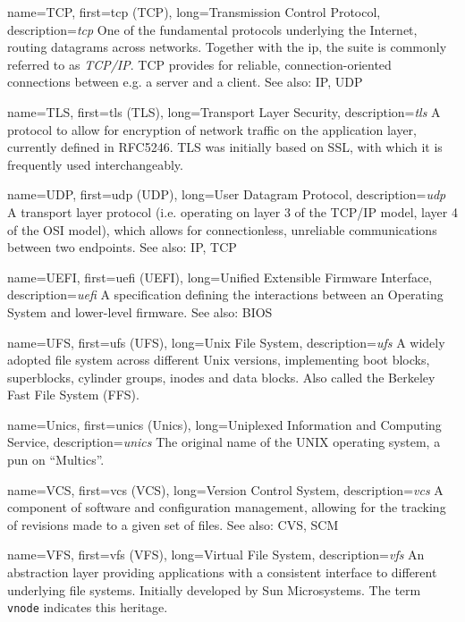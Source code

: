 {
	name={TCP},
	first={\acrlong{tcp} (TCP)},
	long={Transmission Control Protocol},
	description={{\em \acrlong{tcp}} One of the fundamental protocols underlying the
Internet, routing datagrams across networks.  Together
with the \acrlong{ip}, the suite is commonly referred
to as {\em TCP/IP}.  TCP provides for reliable,
connection-oriented connections between e.g. a server
and a client.  See also: IP, UDP}
}

{
	name={TLS},
	first={\acrlong{tls} (TLS)},
	long={Transport Layer Security},
	description={{\em \acrlong{tls}} A protocol to allow for
encryption of network traffic on the application layer, currently defined
in RFC5246.  TLS was initially based on SSL, with which it is frequently
used interchangeably.}
}

{
	name={UDP},
	first={\acrlong{udp} (UDP)},
	long={User Datagram Protocol},
	description={{\em \acrlong{udp}} A transport
layer protocol (i.e. operating on layer 3 of the
TCP/IP model, layer 4 of the OSI model), which allows
for connectionless, unreliable communications between
two endpoints.  See also: IP, TCP}
}

{
	name={UEFI},
	first={\acrlong{uefi} (UEFI)},
	long={Unified Extensible Firmware Interface},
	description={{\em \acrlong{uefi}} A specification
defining the interactions between an Operating System and lower-level
firmware.  See also: BIOS}
}

{
	name={UFS},
	first={\acrlong{ufs} (UFS)},
	long={Unix File System},
	description={{\em \acrlong{ufs}} A widely adopted file system across
different Unix versions, implementing boot blocks, superblocks, cylinder
groups, inodes and data blocks.  Also called the Berkeley Fast File System
(FFS).}
}

{
	name={Unics},
	first={\acrlong{unics} (Unics)},
	long={Uniplexed Information and Computing Service},
	description={{\em \acrlong{unics}} The
original name of the UNIX operating system, a pun on
``Multics''.}
}

{
	name={VCS},
	first={\acrlong{vcs} (VCS)},
	long={Version Control System},
	description={{\em \acrlong{vcs}} A
component of software and configuration management,
allowing for the tracking of revisions made to a given
set of files.  See also: CVS, SCM}
}

{
	name={VFS},
	first={\acrlong{vfs} (VFS)},
	long={Virtual File System},
	description={{\em \acrlong{vfs}} An abstraction layer providing
applications with a consistent interface to different underlying
file systems.  Initially developed by Sun Microsystems.  The term {\tt
vnode} indicates this heritage.}
}

